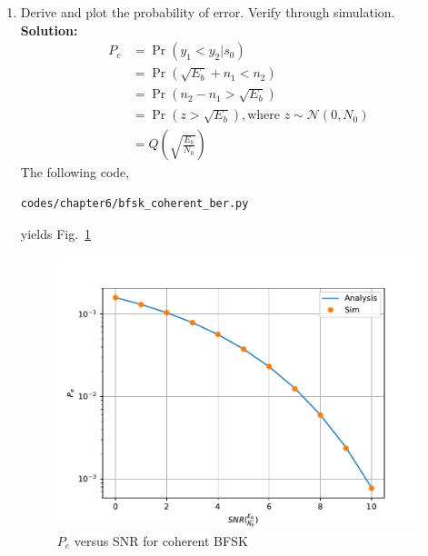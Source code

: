\documentclass[journal,10pt,twocolumn]{IEEEtran}
\newcommand\figref{Fig.~\ref}
\providecommand{\pr}[1]{\ensuremath{\Pr\left(#1\right)}}
\providecommand{\qfunc}[1]{\ensuremath{Q\left(#1\right)}}
\newcommand{\solution}{\noindent \textbf{Solution: }}
\providecommand{\gauss}[2]{\mathcal{N}\ensuremath{\left(#1,#2\right)}}
\begin{document}
\begin{enumerate}
\item
Derive and plot the probability of error.  Verify through simulation.\\
\solution 
\begin{align}
	P_e &= \pr{y_1<y_2|s_0}\\
	&= \pr{\sqrt{E_b}+n_1<n_2}\\
	&= \pr{n_2-n_1 > \sqrt{E_b}}\\ \nonumber
	&= \pr{z > \sqrt{E_b}}, \text{where $z \sim \gauss{0}{N_0}$}\\
	&= \qfunc{\sqrt{\frac{E_b}{N_0}}}
\end{align}
The following code,
\begin{lstlisting}
codes/chapter6/bfsk_coherent_ber.py
\end{lstlisting}
yields \figref{fig:bfsk_coherent_ber}
\begin{figure}[H]
\centering
\includegraphics[width=\columnwidth]{./figs/chapter6/bfsk_coherent_ber.pdf}
\caption{$P_e$ versus SNR for coherent BFSK}
\label{fig:bfsk_coherent_ber}
\end{figure}
\end{enumerate}

%
\end{document}
